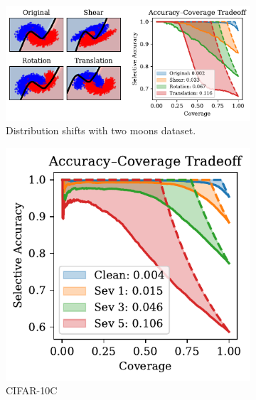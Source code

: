 \begin{figure}[t]
  \centering
  \begin{subfigure}[t]{0.49\textwidth}
  \centering
    \includegraphics[width=\linewidth]{figs/sc_bounds/2moons_shift.pdf}%
    \caption{Distribution shifts with two moons dataset.}
    \label{fig:left}
  \end{subfigure}
  \begin{subfigure}[t]{0.24\textwidth}
    \centering
    \includegraphics[width=\linewidth]{figs/sc_bounds/cifar10c_tradeoffs.pdf} 
    \caption{CIFAR-10C}
    \label{fig:right}
  \end{subfigure}
  \begin{subfigure}[t]{0.24\textwidth}
    \centering

\end{subfigure}
\end{figure}
